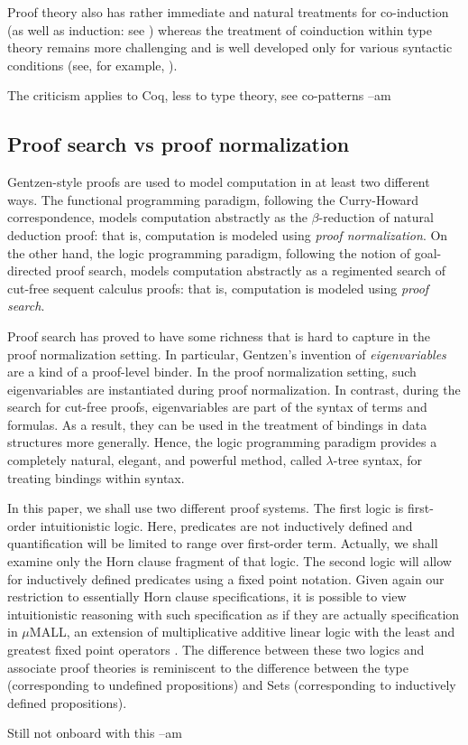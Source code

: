 \documentclass[a4paper,USenglish,cleveref, autoref, thm-restate]{lipics-v2019}
\begin{document}
Proof theory also has rather immediate and natural treatments for
co-induction (as well as induction: see
\cite{baelde12tocl,momigliano12jal}) whereas the treatment of
coinduction within type theory remains more challenging and is well
developed only for various syntactic conditions (see, for example,
\cite{bertot08entcs}).
\begin{metanote}
  The criticism applies to Coq, less to type theory, see co-patterns --am
\end{metanote}

\subsection{Proof search vs proof normalization}

Gentzen-style proofs are used to model computation in at least two
different ways.  The functional programming paradigm, following the
Curry-Howard correspondence, models computation abstractly as the
$\beta$-reduction of natural deduction proof: that is, computation is
modeled using \emph{proof normalization}.  On the other hand, the
logic programming paradigm, following the notion of goal-directed
proof search, models computation abstractly as a regimented search of
cut-free sequent calculus proofs: that is, computation is modeled
using \emph{proof search}.

Proof search has proved to have some richness that is hard to capture
in the proof normalization setting.  In particular, Gentzen's
invention of \emph{eigenvariables} are a kind of a proof-level
binder.  In the proof normalization setting, such eigenvariables
are instantiated during proof normalization.  In contrast, during the
search for cut-free proofs, eigenvariables are part of the syntax of
terms and formulas.  As a result, they can be used in the treatment of
bindings in data structures more generally.  Hence, the logic
programming paradigm provides a completely natural, elegant, and
powerful method, called $\lambda$-tree syntax, for treating bindings
within syntax.

In this paper, we shall use two different proof systems.  The first
logic is first-order intuitionistic logic.  Here, predicates
are not inductively defined and quantification will be limited to
range over first-order term.  Actually, we shall examine only the Horn
clause fragment of that logic.
%
The second logic will allow for inductively defined predicates using a
fixed point notation.   Given again our restriction to essentially
Horn clause specifications, it is possible to view intuitionistic
reasoning with such specification as if they are actually
specification in $\mu$MALL, an extension of multiplicative additive
linear logic with the least and greatest fixed point operators
\cite{baelde12tocl,baelde07lpar,heath19jar}.
%
The difference between these two logics and associate proof theories
is reminiscent to the difference between the type 
(corresponding to undefined propositions) and Sets (corresponding to
inductively defined propositions).
\begin{metanote}
  Still not onboard with this --am
\end{metanote}
\end{document}
